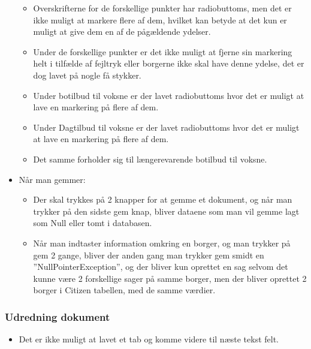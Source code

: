 \begin{itemize}
\begin{itemize}
\item Overskrifterne for de forskellige punkter har radiobuttoms, men det er ikke muligt at markere flere af dem, hvilket kan betyde at det kun er muligt at give dem en af de pågældende ydelser.
\item Under de forskellige punkter er det ikke muligt at fjerne sin markering helt i tilfælde af fejltryk eller borgerne ikke skal have denne ydelse, det er dog lavet på nogle få stykker.
\item Under botilbud til voksne er der lavet radiobuttoms hvor det er muligt at lave en markering på flere af dem.
\item Under Dagtilbud til voksne er der lavet radiobuttoms hvor det er muligt at lave en markering på flere af dem.
\item Det samme forholder sig til længerevarende botilbud til voksne.
\end{itemize}
\item Når man gemmer:
\begin{itemize}
\item Der skal trykkes på 2 knapper for at gemme et dokument, og når man trykker på den sidste gem knap, bliver dataene som man vil gemme lagt som Null eller tomt i databasen.
\item Når man indtaster information omkring en borger, og man trykker på gem 2 gange, bliver der anden gang man trykker gem smidt en ”NullPointerException”, og der bliver kun oprettet en sag selvom det kunne være 2 forskellige sager på samme borger, men der bliver oprettet 2 borger i Citizen tabellen, med de samme værdier.
\end{itemize}
\end{itemize}
\subsubsection{Udredning dokument}
\begin{itemize}
\item Det er ikke muligt at lavet et tab og komme videre til næste tekst felt.\end{itemize}
